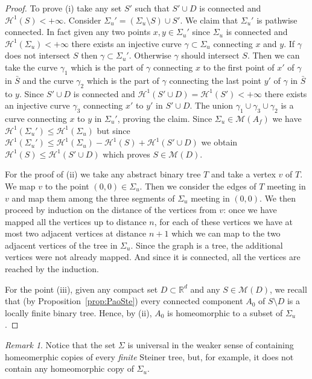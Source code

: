 \documentclass{amsart}
\newcommand{\RR}{\mathbb R}
\renewcommand{\H}{\mathcal H}
\newcommand{\M}{\mathcal{M}}
\renewcommand{\H}{\mathcal{H}}
\theoremstyle{definition}
\theoremstyle{remark}
\newtheorem{remark}[theorem]{Remark}
\begin{document}
\begin{proof}
To prove (i) take any set $S'$ such that $S'\cup D$ is connected 
and $\H^1(S)<+\infty$. 
Consider $\Sigma_u' = (\Sigma_u\setminus S) \cup S'$.
We claim that $\Sigma_u'$ is pathwise connected. 
In fact given any two points $x,y\in \Sigma_u'$ since $\Sigma_u$ is connected 
and $\H^1(\Sigma_u)<+\infty$ there exists an injective curve $\gamma \subset \Sigma_u$ 
connecting $x$ and $y$. If $\gamma$ does not intersect $S$ then $\gamma\subset \Sigma_u'$.
Otherwise $\gamma$ should intersect $S$. 
Then we can take the curve $\gamma_1$ which is the part of $\gamma$ connecting $x$ 
to the first point of $x'$ of $\gamma$ in $\bar S$ 
and the curve $\gamma_2$ which is the part of $\gamma$
connecting the last point $y'$ of $\gamma$ in $\bar S$ to $y$. 
Since $S'\cup D$ is connected 
and $\H^1(S'\cup D)=\H^1(S')<+\infty$ there exists an injective 
curve $\gamma_3$ connecting $x'$ to $y'$ in $S'\cup D$. 
The union $\gamma_1\cup \gamma_3\cup \gamma_2$ is a curve connecting $x$ to $y$ 
in $\Sigma_u'$, proving the claim.
Since $\Sigma_u\in \M(A_f)$ we have $\H^1(\Sigma_u')\le \H^1(\Sigma_u)$
but since $\H^1(\Sigma_u') \le \H^1(\Sigma_u)-\H^1(S) + \H^1(S'\cup D)$ 
we obtain $\H^1(S)\le \H^1(S'\cup D)$ which proves $S\in \M(D)$.

For the proof of (ii) we take any abstract binary tree $T$ and take a vertex $v$ of $T$.
We map $v$ to the point $(0,0)\in \Sigma_u$. 
Then we consider the edges of $T$ meeting in $v$ and map them 
among the three segments of $\Sigma_u$ meeting in $(0,0)$. 
We then proceed by induction on the distance of the vertices from $v$: once 
we have mapped all the vertices up to distance $n$, for each of these vertices 
we have at most two adjacent vertices at distance $n+1$ which we can map to the two 
adjacent vertices of the tree in $\Sigma_u$.
Since the graph is a tree, the additional vertices were not already mapped.
And since it is connected, all the vertices are reached by the induction.

For the point (iii), given any compact set $D\subset \RR^d$ and any $S\in \M(D)$,
we recall that (by Proposition~\ref{prop:PaoSte}) every connected component $A_0$ 
of $S\setminus D$ is a locally finite binary tree. 
Hence, by (ii), $A_0$ is homeomorphic to a subset of $\Sigma_u$.
\end{proof}

\begin{remark}
Notice that the set $\Sigma$ is universal in the weaker 
sense of containing homeomerphic copies of every \emph{finite}
Steiner tree, but, for example, it does not contain any 
homeomorphic copy of $\Sigma_u$.
\end{remark}
\end{document}
